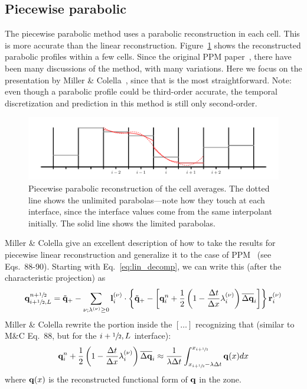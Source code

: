 \subsection{Piecewise parabolic}

\label{sec:hydro:ppm}

The piecewise parabolic method uses a parabolic reconstruction in each
cell.  This is more accurate than the linear reconstruction.
Figure~\ref{fig:ppm} shows the reconstructed parabolic profiles within
a few cells.  Since the original PPM
paper~\cite{colellawoodward:1984}, there have been many discussions of
the method, with many variations.  Here we focus on the presentation
by Miller \& Colella~\cite{millercolella:2002}, since that is the most
straightforward.  Note: even though a parabolic profile could be
third-order accurate, the temporal discretization and prediction in
this method is still only second-order.
%
\begin{figure}[t]
\centering
\includegraphics[width=\linewidth]{piecewise-parabolic}
\caption[Piecewise parabolic reconstruction of the cell
  averages]{\label{fig:ppm} Piecewise parabolic reconstruction of the
  cell averages.  The dotted line shows the unlimited parabolas---note
  how they touch at each interface, since the interface values come
  from the same interpolant initially.  The solid line shows the
  limited parabolas.}
\end{figure}


Miller \& Colella give an excellent description of how to take the
results for piecewise linear reconstruction and generalize it to the case of
PPM~\cite{colellawoodward:1984} (see Eqs.\ 88-90).  Starting with
Eq.~\ref{eq:lin_decomp}, we can write this (after the characteristic
projection) as
\begin{equation}
{\bf q}_{i+{\sfrac{1}{2}},L}^{n+{\sfrac{1}{2}}} = \tilde{{\bf q}}_+ -
   \sum_{\nu;\lambda^{(\nu)}\ge 0} {\bf l}_i^{(\nu)} \cdot \left \{
        \tilde{{\bf q}}_+ - \left [ {\bf q}_i^n +
            \frac{1}{2} \left ( 1 - \frac{\Delta t}{\Delta x} \lambda_i^{(\nu)} \right ) \overline{\Delta {\bf q}}_i \right ]
       \right \} {\bf r}_i^{(\nu)}
\end{equation}
Miller \& Colella rewrite the portion inside the $[\ldots]$
recognizing that (similar to M\&C Eq.\ 88, but for the $i+{\sfrac{1}{2}},L$ interface):
\begin{equation}
  {\bf q}_i^n + \frac{1}{2} \left (1 - \frac{\Delta t}{\Delta x} \lambda_i^{(\nu)} \right ) \overline{\Delta {\bf q}}_i
  \approx \frac{1}{\lambda \Delta t} \int_{x_{i+{\sfrac{1}{2}}} - \lambda \Delta t}^{x_{i+{\sfrac{1}{2}}}}
           {\bf q}(x) dx
\end{equation}
where ${\bf q}(x)$ is the reconstructed functional form of ${\bf q}$ in the zone.


